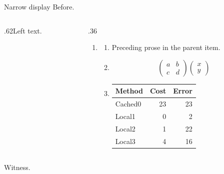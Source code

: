 \documentclass[12pt,aspectratio=169]{beamer}
\begin{document}
\begin{frame}[t,shrink=5]{Narrow display}
Before.\par
\begin{columns}[onlytextwidth,T]
\begin{column}{.62\textwidth}Left text.\end{column}
\begin{column}{.36\textwidth}
\begin{enumerate}\item \begin{enumerate}
\item Preceding prose in the parent item.
\item \[\begin{pmatrix}a&b\\c&d\end{pmatrix}\begin{pmatrix}x\\y\end{pmatrix}\]
\item \begin{tabular}{lrr}Method&Cost&Error\\\hline Cached0&23&23\\Local1&0&2\\Local2&1&22\\Local3&4&16\\\end{tabular}
\end{enumerate}\end{enumerate}
\end{column}\end{columns}
Witness.\par
\end{frame}
\end{document}
